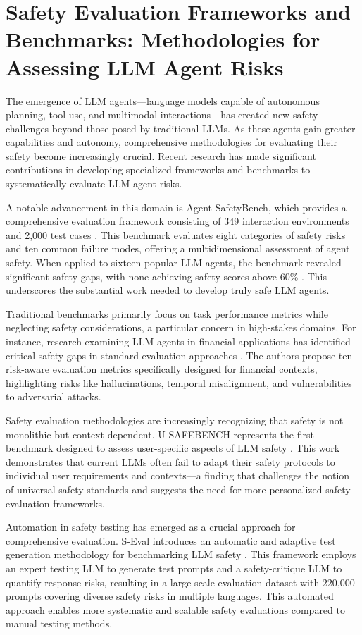 \documentclass[conference]{IEEEtran}
\begin{document}
\section{Safety Evaluation Frameworks and Benchmarks: Methodologies for Assessing LLM Agent Risks}

The emergence of LLM agents—language models capable of autonomous planning, tool use, and multimodal interactions—has created new safety challenges beyond those posed by traditional LLMs. As these agents gain greater capabilities and autonomy, comprehensive methodologies for evaluating their safety become increasingly crucial. Recent research has made significant contributions in developing specialized frameworks and benchmarks to systematically evaluate LLM agent risks.

A notable advancement in this domain is Agent-SafetyBench, which provides a comprehensive evaluation framework consisting of 349 interaction environments and 2,000 test cases \cite{2412.14470}. This benchmark evaluates eight categories of safety risks and ten common failure modes, offering a multidimensional assessment of agent safety. When applied to sixteen popular LLM agents, the benchmark revealed significant safety gaps, with none achieving safety scores above 60\% \cite{2412.14470}. This underscores the substantial work needed to develop truly safe LLM agents.

Traditional benchmarks primarily focus on task performance metrics while neglecting safety considerations, a particular concern in high-stakes domains. For instance, research examining LLM agents in financial applications has identified critical safety gaps in standard evaluation approaches \cite{2502.15865}. The authors propose ten risk-aware evaluation metrics specifically designed for financial contexts, highlighting risks like hallucinations, temporal misalignment, and vulnerabilities to adversarial attacks.

Safety evaluation methodologies are increasingly recognizing that safety is not monolithic but context-dependent. U-SAFEBENCH represents the first benchmark designed to assess user-specific aspects of LLM safety \cite{2502.15086}. This work demonstrates that current LLMs often fail to adapt their safety protocols to individual user requirements and contexts—a finding that challenges the notion of universal safety standards and suggests the need for more personalized safety evaluation frameworks.

Automation in safety testing has emerged as a crucial approach for comprehensive evaluation. S-Eval introduces an automatic and adaptive test generation methodology for benchmarking LLM safety \cite{2405.14191}. This framework employs an expert testing LLM to generate test prompts and a safety-critique LLM to quantify response risks, resulting in a large-scale evaluation dataset with 220,000 prompts covering diverse safety risks in multiple languages. This automated approach enables more systematic and scalable safety evaluations compared to manual testing methods.
\end{document}
